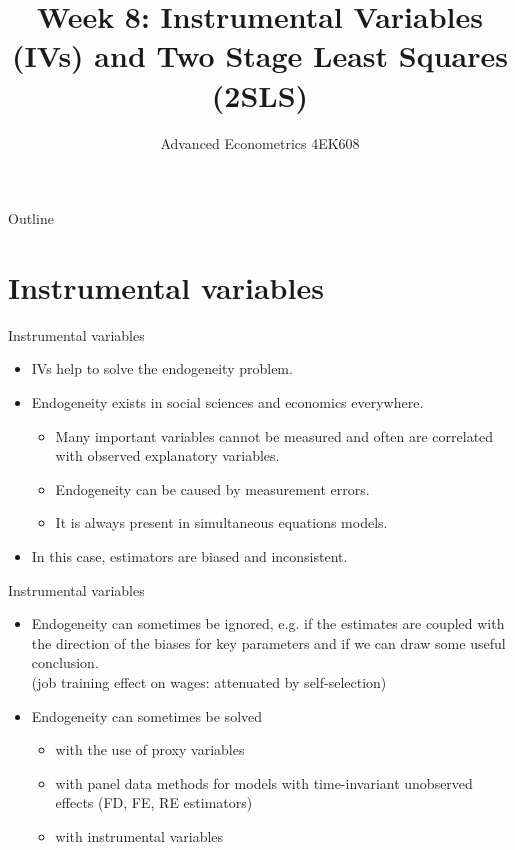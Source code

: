 \documentclass[usenames,dvipsnames]{beamer}
\title[Week8]{Week 8: Instrumental Variables (IVs) and Two Stage Least Squares (2SLS)}
\author{Advanced Econometrics 4EK608}
\institute{Vysoká škola ekonomická v Praze}
\date{}
\begin{document}
 
\begin{frame}
  \titlepage
\end{frame}

\begin{frame}{Outline}
  \tableofcontents
\end{frame}

\section{Instrumental variables}
\begin{frame}{Instrumental variables}
\begin{itemize}
\item  IVs help to solve the endogeneity problem.
\vspace{0.3cm}
\item Endogeneity exists  in social sciences and economics everywhere.
\vspace{0.3cm}
\begin{itemize}
\item Many important variables cannot be measured
and often are correlated with observed explanatory variables.
\item Endogeneity can be caused by measurement errors.
\item It is always present in simultaneous equations models.
\end{itemize}
\vspace{0.3cm}
\item In this case, estimators are biased and inconsistent.
\end{itemize}
\end{frame}


\begin{frame}{Instrumental variables}
\begin{itemize}
\item  Endogeneity can sometimes be ignored, e.g. if  the estimates are coupled with the direction of the biases for key parameters and if we can draw some useful conclusion. \\(job training effect on wages: attenuated by self-selection)
\vspace{0.3cm}
\item Endogeneity can sometimes be solved
\vspace{0.3cm}
\begin{itemize}
\item with the use of proxy variables
\medskip
\item with panel data methods for models with time-invariant unobserved effects (FD, FE, RE  estimators)
\medskip
\item with instrumental variables
\end{itemize}
\end{itemize}
\end{frame}
\end{document}
